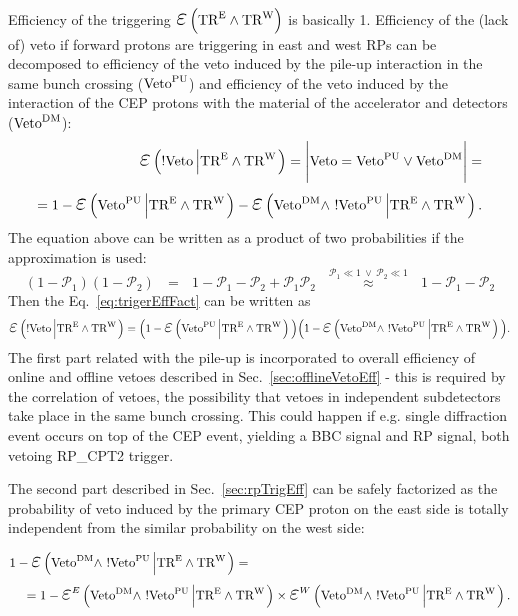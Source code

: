 Efficiency of the triggering $\mbox{\LARGE$\varepsilon$}\left(\TRE\land\TRW\right)$ is basically 1. Efficiency of the (lack of) veto if forward protons are triggering in east and west RPs can be decomposed to efficiency of the veto induced by the pile-up interaction in the same bunch crossing ($\text{Veto}^{\text{PU}}$) and efficiency of the veto induced by the interaction of the CEP protons with the material of the accelerator and detectors ($\text{Veto}^{\text{DM}}$):
\begin{equation}\label{eq:trigerEffFact}
\begin{split}
\mbox{\LARGE$\varepsilon$}\left(!\V\left|\TRE\land\TRW\right.\right)=\Bigg|\V=\Vpu\vee\Vdm\Bigg|=\\=1-\mbox{\LARGE$\varepsilon$}\left(\Vpu\left|\TRE\land\TRW\right.\right)-\mbox{\LARGE$\varepsilon$}\left(\Vdm\land~!\Vpu\left|\TRE\land\TRW\right.\right).
\end{split}
\end{equation}
The equation above can be written as a product of two probabilities if the approximation is used:
\[(1-\mathcal{P}_{1})(1-\mathcal{P}_{2})~~~=~~~1 - \mathcal{P}_{1} - \mathcal{P}_{2} + \mathcal{P}_{1}\mathcal{P}_{2}~~~\overset{\mathcal{P}_{1} \ll 1~\lor~\mathcal{P}_{2} \ll 1 }{\approx}~~~1 - \mathcal{P}_{1} - \mathcal{P}_{2}\]
Then the Eq.~\eqref{eq:trigerEffFact} can be written as
\begin{equation}
\mbox{\LARGE$\varepsilon$}\left(!\V\left|\TRE\land\TRW\right.\right) = \Big(1-\mbox{\LARGE$\varepsilon$}\left(\Vpu\left|\TRE\land\TRW\right.\right)\Big)\Big(1-\mbox{\LARGE$\varepsilon$}\left(\Vdm\land~!\Vpu\left|\TRE\land\TRW\right.\right)\Big).
\end{equation}
The first part related with the pile-up is incorporated to overall efficiency of online and offline vetoes described in Sec.~\ref{sec:offlineVetoEff} - this is required by the correlation of vetoes, the possibility that vetoes in independent subdetectors take place in the same bunch crossing. This could happen if e.g. single diffraction event occurs on top of the CEP event, yielding a BBC signal and RP signal, both vetoing RP\_CPT2 trigger.

The second part described in Sec.~\ref{sec:rpTrigEff}  can be safely factorized as the probability of veto induced by the primary CEP proton on the east side is totally independent from the similar probability on the west side:

\begin{equation}
\begin{split}
1-\mbox{\LARGE$\varepsilon$}\left(\Vdm\land~!\Vpu\left|\TRE\land\TRW\right.\right) =~~~~~~~~~~~~~~~~~~~~~~~~~~~~~~~~~~~~~~~~~~~~~~~~~~~~~~~~~~~~~~\\=
 1-\mbox{\LARGE$\varepsilon$}^{E}\left(\Vdm\land~!\Vpu\left|\TRE\land\TRW\right.\right) \times
 \mbox{\LARGE$\varepsilon$}^{W}\left(\Vdm\land~!\Vpu\left|\TRE\land\TRW\right.\right).
 \end{split}
\end{equation}


